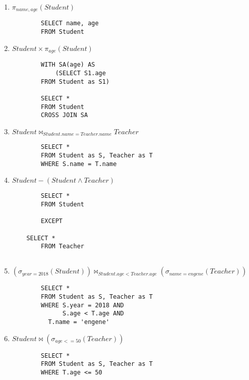 \documentclass{article}
\begin{document}
\begin{enumerate}
    \item $\pi _{name,age}(Student)$
    \begin{lstlisting}
        SELECT name, age 
        FROM Student
    \end{lstlisting}
    
    \item $Student \times \pi_{age}(Student)$
    \begin{lstlisting}
        WITH SA(age) AS
        	(SELECT S1.age
		FROM Student as S1)
          
        SELECT * 
        FROM Student
        CROSS JOIN SA  
    \end{lstlisting}
    
    \item $Student \bowtie_{Student.name=Teacher.name} Teacher $
    \begin{lstlisting}
        SELECT *
        FROM Student as S, Teacher as T
        WHERE S.name = T.name
    \end{lstlisting}
    
    \item $Student - (Student \land Teacher)$
    \begin{lstlisting}
        SELECT *
        FROM Student
        
        EXCEPT 
        	
	SELECT *
       	FROM Teacher
	        
    \end{lstlisting}
    
    \item $(\sigma_{year=2018}(Student) )\bowtie_{Student.age < Teacher.age} (\sigma_{name=engene}(Teacher))$
    \begin{lstlisting}
        SELECT *
        FROM Student as S, Teacher as T
        WHERE S.year = 2018 AND
      	      S.age < T.age AND 
	      T.name = 'engene'
    \end{lstlisting}
    
    \item $Student \bowtie (\sigma_{age<=50}(Teacher))$
    \begin{lstlisting}
        SELECT *
        FROM Student as S, Teacher as T
        WHERE T.age <= 50
    \end{lstlisting}
\end{enumerate}


\end{document}
